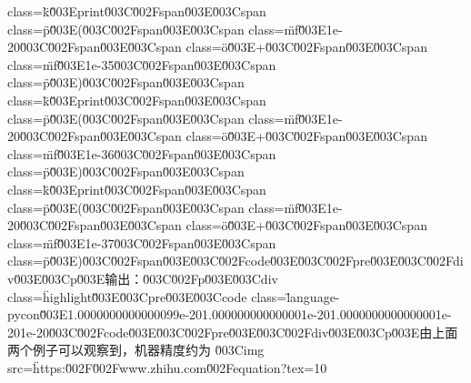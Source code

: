 class=\"k\"\u003Eprint\u003C\u002Fspan\u003E\u003Cspan class=\"p\"\u003E(\u003C\u002Fspan\u003E\u003Cspan class=\"mf\"\u003E1e-20\u003C\u002Fspan\u003E\u003Cspan class=\"o\"\u003E+\u003C\u002Fspan\u003E\u003Cspan class=\"mf\"\u003E1e-35\u003C\u002Fspan\u003E\u003Cspan class=\"p\"\u003E)\u003C\u002Fspan\u003E\n\u003Cspan class=\"k\"\u003Eprint\u003C\u002Fspan\u003E\u003Cspan class=\"p\"\u003E(\u003C\u002Fspan\u003E\u003Cspan class=\"mf\"\u003E1e-20\u003C\u002Fspan\u003E\u003Cspan class=\"o\"\u003E+\u003C\u002Fspan\u003E\u003Cspan class=\"mf\"\u003E1e-36\u003C\u002Fspan\u003E\u003Cspan class=\"p\"\u003E)\u003C\u002Fspan\u003E\n\u003Cspan class=\"k\"\u003Eprint\u003C\u002Fspan\u003E\u003Cspan class=\"p\"\u003E(\u003C\u002Fspan\u003E\u003Cspan class=\"mf\"\u003E1e-20\u003C\u002Fspan\u003E\u003Cspan class=\"o\"\u003E+\u003C\u002Fspan\u003E\u003Cspan class=\"mf\"\u003E1e-37\u003C\u002Fspan\u003E\u003Cspan class=\"p\"\u003E)\u003C\u002Fspan\u003E\u003C\u002Fcode\u003E\u003C\u002Fpre\u003E\u003C\u002Fdiv\u003E\u003Cp\u003E输出：\u003C\u002Fp\u003E\u003Cdiv class=\"highlight\"\u003E\u003Cpre\u003E\u003Ccode class=\"language-pycon\"\u003E1.0000000000000099e-20\n1.000000000000001e-20\n1.0000000000000001e-20\n1e-20\u003C\u002Fcode\u003E\u003C\u002Fpre\u003E\u003C\u002Fdiv\u003E\u003Cp\u003E由上面两个例子可以观察到，机器精度约为 \u003Cimg src=\"https:\u002F\u002Fwww.zhihu.com\u002Fequation?tex=10%